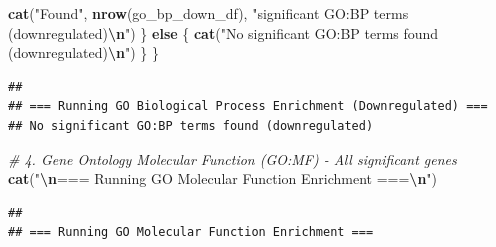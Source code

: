 \documentclass[
]{article}
\newenvironment{Shaded}{\begin{snugshade}}{\end{snugshade}}
\newcommand{\CommentTok}[1]{\textcolor[rgb]{0.56,0.35,0.01}{\textit{#1}}}
\newcommand{\ControlFlowTok}[1]{\textcolor[rgb]{0.13,0.29,0.53}{\textbf{#1}}}
\newcommand{\FunctionTok}[1]{\textcolor[rgb]{0.13,0.29,0.53}{\textbf{#1}}}
\newcommand{\NormalTok}[1]{#1}
\newcommand{\SpecialCharTok}[1]{\textcolor[rgb]{0.81,0.36,0.00}{\textbf{#1}}}
\newcommand{\StringTok}[1]{\textcolor[rgb]{0.31,0.60,0.02}{#1}}
\begin{document}
\begin{Shaded}
\begin{Highlighting}[]
    \FunctionTok{cat}\NormalTok{(}\StringTok{"Found"}\NormalTok{, }\FunctionTok{nrow}\NormalTok{(go\_bp\_down\_df), }\StringTok{"significant GO:BP terms (downregulated)}\SpecialCharTok{\textbackslash{}n}\StringTok{"}\NormalTok{)}
\NormalTok{  \} }\ControlFlowTok{else}\NormalTok{ \{}
    \FunctionTok{cat}\NormalTok{(}\StringTok{"No significant GO:BP terms found (downregulated)}\SpecialCharTok{\textbackslash{}n}\StringTok{"}\NormalTok{)}
\NormalTok{  \}}
\NormalTok{\}}
\end{Highlighting}
\end{Shaded}

\begin{verbatim}
## 
## === Running GO Biological Process Enrichment (Downregulated) ===
## No significant GO:BP terms found (downregulated)
\end{verbatim}

\begin{Shaded}
\begin{Highlighting}[]
\CommentTok{\# 4. Gene Ontology Molecular Function (GO:MF) {-} All significant genes}
\FunctionTok{cat}\NormalTok{(}\StringTok{"}\SpecialCharTok{\textbackslash{}n}\StringTok{=== Running GO Molecular Function Enrichment ===}\SpecialCharTok{\textbackslash{}n}\StringTok{"}\NormalTok{)}
\end{Highlighting}
\end{Shaded}

\begin{verbatim}
## 
## === Running GO Molecular Function Enrichment ===
\end{verbatim}
\end{document}
